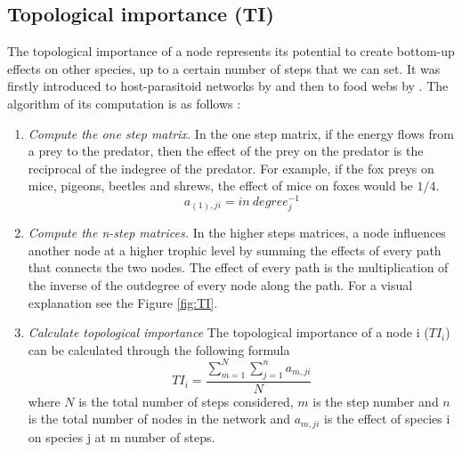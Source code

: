 \documentclass[twocolumn]{article}
\begin{document}
    \subsection*{Topological importance (TI)}
        The topological importance of a node represents its potential to create bottom-up effects on other species, up to a certain number of steps that we can set. It was firstly introduced to host-parasitoid networks by \citet{Muller1999} and then to food webs by \citet{Jordan2003}. The algorithm of its computation is as follows \citep{Jordan2009}:
        \begin{enumerate}
            \item \emph{Compute the one step matrix.} \smallskip \newline 
            In the one step matrix, if the energy flows from a prey to the predator, then the effect of the prey on the predator is the reciprocal of the indegree of the predator. For example, if the fox preys on mice, pigeons, beetles and shrews, the effect of mice on foxes would be $1/4$. 
            \begin{equation}
                a_{(1),ji}=in\:degree^{-1}_j
            \end{equation}
            \item \emph{Compute the n-step matrices.} \smallskip \newline 
            In the higher steps matrices, a node influences another node at a higher trophic level by summing the effects of every path that connects the two nodes. The effect of every path is the multiplication of the inverse of the outdegree of every node along the path. For a visual explanation see the Figure \ref{fig:TI}. 
            \item \emph{Calculate topological importance} \smallskip \newline
            The topological importance of a node i ($TI_i$) can be calculated through the following formula
            \begin{equation} TI_i=\frac{\sum\limits^N_{m=1}\sum\limits^n_{j=1}a_{m,ji}}{N} \end{equation}
            where $N$ is the total number of steps considered, $m$ is the step number and $n$ is the total number of nodes in the network and $a_{m,ji}$ is the effect of species i on species j at m number of steps.    
        \end{enumerate}
\end{document}
